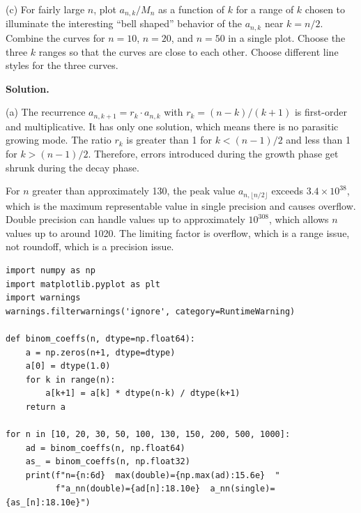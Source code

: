 \documentclass[letterpaper, 11pt]{article}
\newcommand{\1}{\mathds{1}}	%
\theoremstyle{definition}
\begin{document}
(c) For fairly large $n$, plot $a_{n,k}/M_n$ as a function of $k$ for a range of $k$ chosen to illuminate the interesting ``bell shaped'' behavior of the $a_{n,k}$ near $k = n/2$. Combine the curves for $n = 10$, $n = 20$, and $n = 50$ in a single plot. Choose the three $k$ ranges so that the curves are close to each other. Choose different line styles for the three curves.

\medskip

\textbf{Solution.}

(a) The recurrence $a_{n,k+1} = r_k \cdot a_{n,k}$ with $r_k = (n-k)/(k+1)$ is first-order and multiplicative. It has only one solution, which means there is no parasitic growing mode. The ratio $r_k$ is greater than 1 for $k < (n-1)/2$ and less than 1 for $k > (n-1)/2$. Therefore, errors introduced during the growth phase get shrunk during the decay phase.

For $n$ greater than approximately 130, the peak value $a_{n,\lfloor n/2 \rfloor}$ exceeds $3.4 \times 10^{38}$, which is the maximum representable value in single precision and causes overflow. Double precision can handle values up to approximately $10^{308}$, which allows $n$ values up to around 1020. The limiting factor is overflow, which is a range issue, not roundoff, which is a precision issue.

\begin{lstlisting}
import numpy as np
import matplotlib.pyplot as plt
import warnings
warnings.filterwarnings('ignore', category=RuntimeWarning)

def binom_coeffs(n, dtype=np.float64):
    a = np.zeros(n+1, dtype=dtype)
    a[0] = dtype(1.0)
    for k in range(n):
        a[k+1] = a[k] * dtype(n-k) / dtype(k+1)
    return a

for n in [10, 20, 30, 50, 100, 130, 150, 200, 500, 1000]:
    ad = binom_coeffs(n, np.float64)
    as_ = binom_coeffs(n, np.float32)
    print(f"n={n:6d}  max(double)={np.max(ad):15.6e}  "
          f"a_nn(double)={ad[n]:18.10e}  a_nn(single)={as_[n]:18.10e}")
\end{lstlisting}
\end{document}
